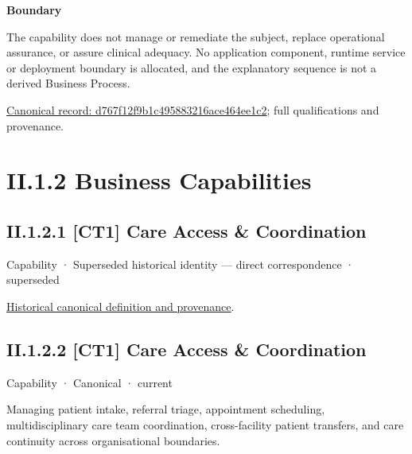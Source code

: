 \textbf{Boundary}



The capability does not manage or remediate the subject, replace operational assurance, or assure clinical adequacy. No application component, runtime service or deployment boundary is allocated, and the explanatory sequence is not a derived Business Process.


{\footnotesize \href{../../../../continuum/strategy/capability/d767f12f9b1c495883216ace464ee1c2.md}{Canonical record: d767f12f9b1c495883216ace464ee1c2}; full qualifications and provenance.}\par
\section*{II.1.2 Business Capabilities}
\label{navigation:II.1.2}

\subsection*{II.1.2.1 [CT1] Care Access \& Coordination}
\label{navigation:II.1.2.1}

\label{element:0dec07b6ddbe48bda93a2295dd3e2d7d}
{\small Capability · Superseded historical identity — direct correspondence · superseded}\par
\href{../../../../continuum/strategy/capability/0dec07b6ddbe48bda93a2295dd3e2d7d.md}{Historical canonical definition and provenance}.\par
\subsection*{II.1.2.2 [CT1] Care Access \& Coordination}
\label{navigation:II.1.2.2}

\label{element:ed342cb8656b4f80b55ad519ecbd2d3a}
{\small Capability · Canonical · current}\par

Managing patient intake, referral triage, appointment scheduling, multidisciplinary care team coordination, cross-facility patient transfers, and care continuity across organisational boundaries.



